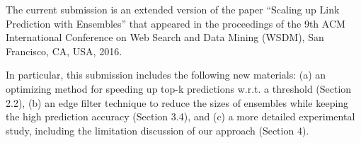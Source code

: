 The current submission is an extended version of the paper ``Scaling up Link Prediction with Ensembles''  that appeared in the proceedings of the 9th ACM International Conference on Web Search and Data Mining (WSDM), San Francisco, CA, USA, 2016.

In particular, this submission includes the following new materials: (a) an optimizing method for speeding up top-k predictions w.r.t. a threshold (Section 2.2), (b) an edge filter technique to reduce the sizes of ensembles while keeping the high prediction accuracy (Section 3.4), and (c) a more detailed experimental study, including the limitation discussion of our approach (Section 4). 